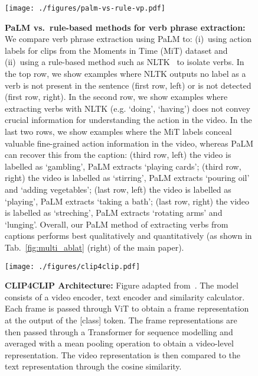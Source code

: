 \begin{figure}[H]
    \centering
    \texttt{[image: ./figures/palm-vs-rule-vp.pdf]}
    \caption{\textbf{PaLM vs.~rule-based methods for verb phrase extraction:} We compare verb phrase extraction using PaLM to:
(i)~using action labels for clips from the Moments in Time (MiT) dataset and (ii)~using a rule-based method such as NLTK~\cite{bird2009natural} to isolate verbs. In the top row, we show examples where NLTK outputs no label as a verb is not present in the sentence (first row, left) or is not detected (first row, right). In the second row, we show examples where extracting verbs with NLTK (e.g. `doing', `having') does not convey crucial information for understanding the action in the video. In the last two rows, we show examples where the MiT labels conceal valuable fine-grained action information in the video, whereas PaLM can recover this from the caption: (third row, left) the video is labelled as `gambling', PaLM extracts `playing cards'; (third row, right) the video is labelled as `stirring', PaLM extracts `pouring oil' and `adding vegetables'; (last row, left) the video is labelled as `playing', PaLM extracts `taking a bath'; (last row, right) the video is labelled as `streching', PaLM extracts `rotating arms' and `lunging'. Overall, our PaLM method of extracting verbs from captions performs best qualitatively and quantitatively (as shown in Tab.~\ref{fig:multi_ablat} (right) of the main paper).}
    \label{fig:palm-vs-rule-vp}
\end{figure} 


 



\begin{figure*}[ht!]
    \centering
    \texttt{[image: ./figures/clip4clip.pdf]}
    \caption{\textbf{CLIP4CLIP Architecture:} Figure adapted from~\cite{Luo2021CLIP4Clip}. The model consists of a video encoder, text encoder and similarity calculator. Each frame is passed through ViT to obtain a frame representation at the output of the [class] token. The  frame representations are then passed through a Transformer for sequence modelling and averaged with a mean pooling operation to obtain a video-level representation. The video representation is then compared to the text representation through the cosine similarity. }
    \label{fig:qualitative}
\end{figure*}




